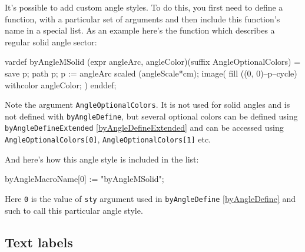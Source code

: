 \documentclass{ltxdoc}
\begin{document}
	It's possible to add custom angle styles. To do this, you first need to define a function, with a particular set of arguments and then include this function's name in a special list. As an example here's the function which describes a regular solid angle sector:
	
\begin{MetaPostCode}
vardef byAngleMSolid (expr angleArc, angleColor)(suffix AngleOptionalColors) =
    save p;
    path p;
    p := angleArc scaled (angleScale*cm);
    image(
        fill ((0, 0)--p--cycle) withcolor angleColor;
    )
enddef;
\end{MetaPostCode}

	Note the argument \texttt{AngleOptionalColors}. It is not used for solid angles and is not defined with \texttt{byAngleDefine}, but several optional colors can be defined using \texttt{byAngleDefineExtended} \ref{byAngleDefineExtended} and can be accessed using \texttt{AngleOptionalColors[0]}, \texttt{AngleOptionalColors[1]} etc.

	And here's how this angle style is included in the list:

\begin{MetaPostCode}
byAngleMacroName[0] := "byAngleMSolid";
\end{MetaPostCode}

	Here \texttt{0} is the value of \texttt{sty} argument used in \texttt{byAngleDefine} \ref{byAngleDefine} and such to call this particular angle style.






\subsection{Text labels}
\end{document}

